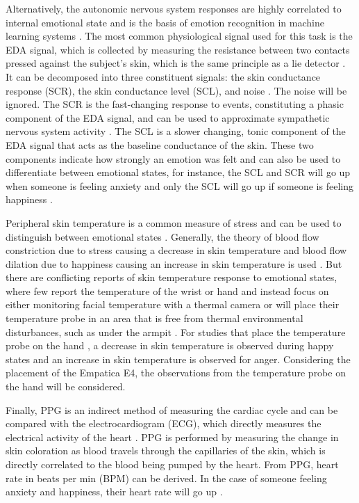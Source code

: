 \documentclass[12pt]{iopart}
\begin{document}
Alternatively, the autonomic nervous system responses are highly correlated to internal emotional state \cite{kreibig2010autonomic} and is the basis of emotion recognition in machine learning systems \cite{healey2005detecting}.  The most common physiological signal used for this task is the EDA signal, which is collected by measuring the resistance between two contacts pressed against the subject’s skin, which is the same principle as a lie detector \cite{society2012publication, arce2021biosensor}.  It can be decomposed into three constituent signals: the skin conductance response (SCR), the skin conductance level (SCL), and noise \cite{greco2015cvxeda}.  The noise will be ignored.  The SCR is the fast-changing response to events, constituting a phasic component of the EDA signal, and can be used to approximate sympathetic nervous system activity \cite{society2012publication, benedek2010continuous}.  The SCL is a slower changing, tonic component of the EDA signal that acts as the baseline conductance of the skin.  These two components indicate how strongly an emotion was felt and can also be used to differentiate between emotional states, for instance, the SCL and SCR will go up when someone is feeling anxiety and only the SCL will go up if someone is feeling happiness \cite{kreibig2010autonomic}.  

Peripheral skin temperature is a common measure of stress and can be used to distinguish between emotional states \cite{collet1997autonomic, salazar2015mental, karthikeyan2012descriptive}.  Generally, the theory of blood flow constriction due to stress causing a decrease in skin temperature and blood flow dilation due to happiness causing an increase in skin temperature is used \cite{karthikeyan2012descriptive}.  But there are conflicting reports of skin temperature response to emotional states, where few report the temperature of the wrist or hand and instead focus on either monitoring facial temperature with a thermal camera \cite{salazar2015mental} or will place their temperature probe in an area that is free from thermal environmental disturbances, such as under the armpit \cite{karthikeyan2012descriptive}.  For studies that place the temperature probe on the hand \cite{collet1997autonomic}, a decrease in skin temperature is observed during happy states and an increase in skin temperature is observed for anger.  Considering the placement of the Empatica E4, the observations from the temperature probe on the hand will be considered.

Finally, PPG is an indirect method of measuring the cardiac cycle and can be compared with the electrocardiogram (ECG), which directly measures the electrical activity of the heart \cite{van2019heartpy}.  PPG is performed by measuring the change in skin coloration as blood travels through the capillaries of the skin, which is directly correlated to the blood being pumped by the heart.  From PPG, heart rate in beats per min (BPM) can be derived.  In the case of someone feeling anxiety and happiness, their heart rate will go up \cite{kreibig2010autonomic}.  
\end{document}
